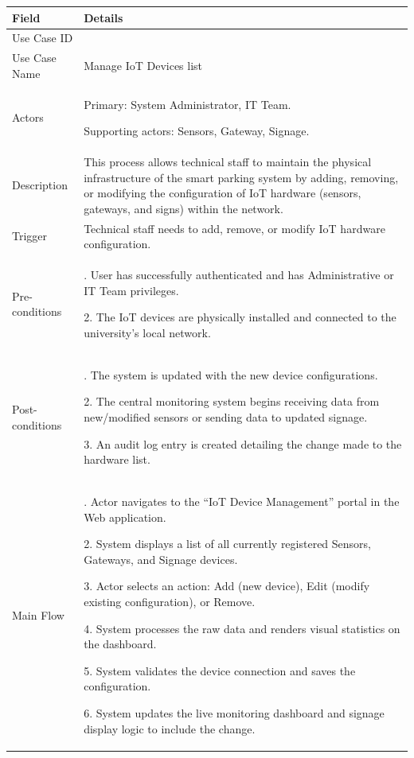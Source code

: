 \begin{table}[H]
\small
\renewcommand{\arraystretch}{1.4}
\begin{tabularx}{\textwidth}{|>{\raggedright\arraybackslash}p{3.5cm}|>{\RaggedRight\arraybackslash}X|}
\hline
\rowcolor{gray!20} \textbf{Field} & \textbf{Details} \\
\hline
Use Case ID & 4.6 \\
\hline
Use Case Name & Manage IoT Devices list \\
\hline
Actors & Primary: System Administrator, IT Team. \par Supporting actors: Sensors, Gateway, Signage. \\
\hline
Description & This process allows technical staff to maintain the physical infrastructure of the smart parking system by adding, removing, or modifying the configuration of IoT hardware (sensors, gateways, and signs) within the network. \\
\hline
Trigger & Technical staff needs to add, remove, or modify IoT hardware configuration. \\
\hline
Pre-conditions & 1. User has successfully authenticated and has Administrative or IT Team privileges. \par 2. The IoT devices are physically installed and connected to the university's local network. \\
\hline
Post-conditions & 1. The system is updated with the new device configurations. \par 2. The central monitoring system begins receiving data from new/modified sensors or sending data to updated signage. \par 3. An audit log entry is created detailing the change made to the hardware list. \\
\hline
Main Flow & 
1. Actor navigates to the ``IoT Device Management'' portal in the Web application. \par
2. System displays a list of all currently registered Sensors, Gateways, and Signage devices. \par
3. Actor selects an action: Add (new device), Edit (modify existing configuration), or Remove. \par
4. System processes the raw data and renders visual statistics on the dashboard. \par
5. System validates the device connection and saves the configuration. \par
6. System updates the live monitoring dashboard and signage display logic to include the change. \\

\end{tabularx}
\end{table}
